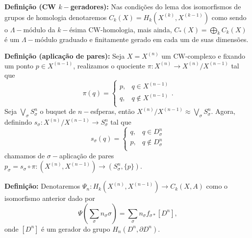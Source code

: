 \documentclass[12pt]{book}
\newcommand{\celula}[2]{D^{#1}_{#2}}
\newcommand{\funcaocond}[5]{
	#1 = 
	\left\{
	\begin{array}{cc}
	#2, & #3\\
	#4, & #5\\
	\end{array}
	\right.
	}
\newcommand{\skeleton}[1]{X^{(#1)}}
\newcommand{\homologiarelcel}[3]{H_{#1}(D^{#2}_{#3}, \partial D^{#2}_{#3})}
\newcommand{\homologiarelskelesimpl}[2]{H_{#1}(X^{(#2)}, X^{(#2-1)})}
\newcommand{\somadir}[1]{\bigoplus \limits_{#1}}
\newcommand{\definicao}[1]{\vspace{2mm} \textbf{Definição:}{ #1}}
\newcommand{\definicaonomeada}[2]{\vspace{2mm} \textbf{Definição (#1):}{ #2}}
\begin{document}
	\definicaonomeada{CW $k-$geradores}{Nas condições do lema dos isomorfismos de grupos de homologia denotaremos $C_{k}(X)=\homologiarelskelesimpl{k}{k}$ como sendo o $\Lambda-$módulo da $k-$ésima CW-homologia, mais ainda, $C_{*}(X) = \somadir{k}C_{k}(X)$ é um $\Lambda-$módulo graduado e finitamente gerado em cada um de suas dimensões.}

	\definicaonomeada{aplicação de pares}{Seja $X = \skeleton{n}$ um CW-complexo e fixando um ponto $p \in \skeleton{n-1}$, realizamos o quociente $\pi : \skeleton{n} \to \skeleton{n}/\skeleton{n-1}$ tal que 	
	$$
		\pi(q) = 
		\left\{
		\begin{array}{cc}
		p, & q \in \skeleton{n-1}\\
		q, & q \notin \skeleton{n-1}\\
		\end{array}
		\right..
	$$
	Seja $\bigvee_{\sigma} S^{n}_{\sigma}$ o buquet de $n-$esfperas, então $\skeleton{n}/\skeleton{n-1} \approx \bigvee_{\sigma} S^{n}_{\sigma}$. Agora, definindo $s_{\sigma} : \skeleton{n}/\skeleton{n-1} \to S^{n}_{\sigma}$ tal que 
	$$
	\funcaocond{s_{\sigma}(q)}{q}{q \in \celula{n}{\sigma}}{p}{q \notin \celula{n}{\sigma}}
	$$
	chamamos de $\sigma-$aplicação de pares $p_{\sigma} = s_{\sigma} \circ \pi : (\skeleton{n}, \skeleton{n-1}) \to (S^{n}_{\sigma}, \{p\})$.}
	
	\definicao{Denotaremos $\Psi_{n}:\homologiarelskelesimpl{k}{n} \to C_{k}(X,A)$ como o isomorfismo anterior dado por 
	$$
	\Psi(\sum_{\sigma} n_{\sigma} \sigma) = \sum_{\sigma} n_{\sigma} f_{\sigma *}[D^{n}],
	$$
	onde $[D^{n}]$ é um gerador do grupo $\homologiarelcel{n}{n}{}$.}
\end{document}
